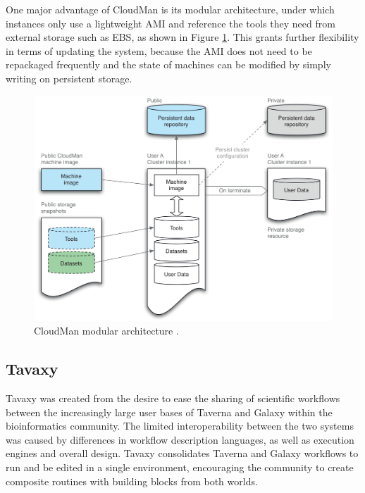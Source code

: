 \documentclass[11pt,a4paper]{report}
\begin{document}


One major advantage of CloudMan is its modular architecture, under which instances only use a lightweight AMI and reference the tools they need from external storage such as EBS, as shown in Figure \ref{CloudManArch}. This grants further flexibility in terms of updating the system, because the AMI does not need to be repackaged frequently and the state of machines can be modified by simply writing on persistent storage.

\vspace{5mm}
\begin{figure}[h]
	\centering
		\includegraphics[scale=0.35]{figures/CloudManArch.png}
	\caption{CloudMan modular architecture \cite{Afgan2010}.}
	\label{CloudManArch}
\end{figure}

\subsection{Tavaxy}

Tavaxy \cite{Abouelhoda2012} was created from the desire to ease the sharing of scientific workflows between the increasingly large user bases of Taverna and Galaxy within the bioinformatics community. The limited interoperability between the two systems was caused by differences in workflow description languages, as well as execution engines and overall design. Tavaxy consolidates Taverna and Galaxy workflows to run and be edited in a single environment, encouraging the community to create composite routines with building blocks from both worlds.
\end{document}
